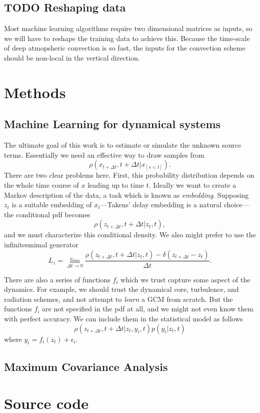 \documentclass{report}
\begin{document}
\section{TODO Reshaping data}

Most machine learning algorithms require two dimensional matrices as inputs, so
we will have to reshape the training data to achieve this. Because the
time-scale of deep atmopsheric convection is so fast, the inputs for the
convection scheme should be non-local in the vertical direction.

\chapter{Methods}

\section{Machine Learning for dynamical systems}

The ultimate goal of this work is to estimate or simulate the unknown source
terms. Essentially we need an effective way to draw samples
from
\[ \rho(x_{t+\Delta t}, t + \Delta t |x_{[s < t]}).\] There are two clear problems here. 
First, this probability distribution depends on the whole time course of
$x$ leading up to time $t$. 
Ideally we want to create a Markov description of the data, a task which is
known as \emph{embedding}. 
Supposing $z_t$ is a suitable embedding of $x_t$---Takens' delay embedding is a natural choice---the conditional pdf becomes
\[\rho(z_{t+\Delta t}, t+ \Delta t| z_t, t),\]
and we must characterize this conditional density.
We also might prefer to use the infinitesmimal generator
\[L_z = \lim_{\Delta t \rightarrow 0} \frac{\rho(z_{t+\Delta t}, t+ \Delta t| z_t,
    t) - \delta(z_{t+\Delta t} - z_t) }{\Delta t}.\]

There are also a series of functions $f_i$ which we trust capture some aspect of
the dynamics. 
For example, we should trust the dynamical core, turbulence, and radiation
schemes, and not attempt to \emph{learn} a GCM from scratch.
But the functions $f_i$ are not specified in the pdf at all, and we might not
even know them with perfect accuracy. We can include them in the statistical
model as follows
\[\rho(z_{t+\Delta t}, t+ \Delta t| z_t, y_i, t) p(y_i|z_t, t) \]
where $y_i = f_i(z_t) + \epsilon_i$.




\section{Maximum Covariance Analysis}
\label{sec:mca}


\printbibliography

\appendix

\chapter{Source code}
\label{sec:source}

% 
\end{document}
